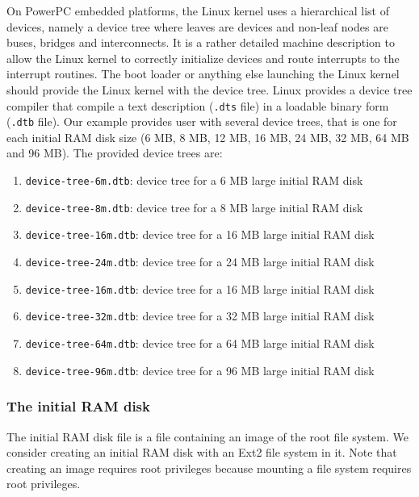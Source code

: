 On PowerPC embedded platforms, the Linux kernel uses a hierarchical list of devices, namely a device tree where leaves are devices and non-leaf nodes are buses, bridges and interconnects.
It is a rather detailed machine description to allow the Linux kernel to correctly initialize devices and route interrupts to the interrupt routines.
The boot loader or anything else launching the Linux kernel should provide the Linux kernel with the device tree.
Linux provides a device tree compiler that compile a text description (\texttt{.dts} file) in a loadable binary form (\texttt{.dtb} file).
Our example provides user with several device trees, that is one for each initial RAM disk size (6 MB, 8 MB, 12 MB, 16 MB, 24 MB, 32 MB, 64 MB and 96 MB).
The provided device trees are:
\begin{enumerate}
\item \texttt{device-tree-6m.dtb}: device tree for a 6 MB large initial RAM disk
\item \texttt{device-tree-8m.dtb}: device tree for a 8 MB large initial RAM disk
\item \texttt{device-tree-16m.dtb}: device tree for a 16 MB large initial RAM disk
\item \texttt{device-tree-24m.dtb}: device tree for a 24 MB large initial RAM disk
\item \texttt{device-tree-16m.dtb}: device tree for a 16 MB large initial RAM disk
\item \texttt{device-tree-32m.dtb}: device tree for a 32 MB large initial RAM disk
\item \texttt{device-tree-64m.dtb}: device tree for a 64 MB large initial RAM disk
\item \texttt{device-tree-96m.dtb}: device tree for a 96 MB large initial RAM disk
\end{enumerate}

\subsubsection{The initial RAM disk}
The initial RAM disk file is a file containing an image of the root file system.
We consider creating an initial RAM disk with an Ext2 file system in it.
Note that creating an image requires root privileges because mounting a file system requires root privileges.

